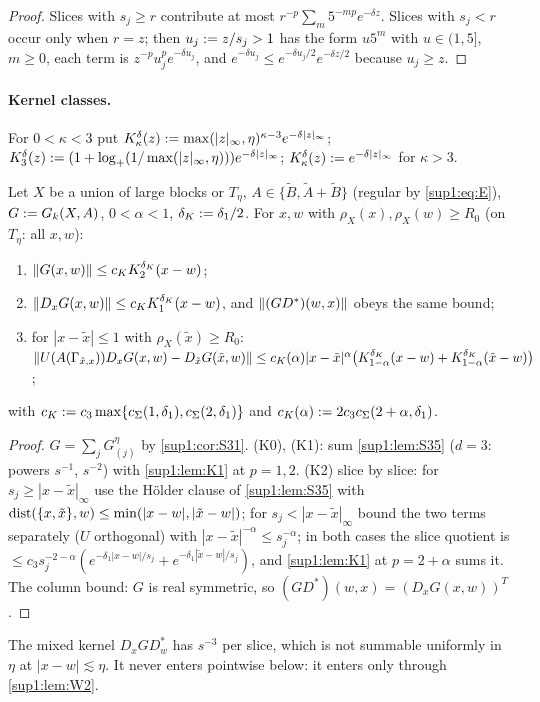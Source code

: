 \begin{proof}
Slices with $s_j\ge r$ contribute at most $r^{-p}\sum_m5^{-mp}e^{-\delta z}$. Slices with $s_j<r$ occur only when $r=z$; then $u_j:= z/s_j>1$ has the form $u5^m$ with $u\in(1,5]$, $m\ge0$, each term is $z^{-p}u_j^pe^{-\delta u_j}$, and $e^{-\delta u_j}\le e^{-\delta u_j/2}e^{-\delta z/2}$ because $u_j\ge z$.
\end{proof}

\paragraph{Kernel classes.} For $0<\kappa<3$ put $K^\delta_\kappa(z):=\max(|z|_\infty,\eta)^{\kappa-3}e^{-\delta|z|_\infty}$; $K^\delta_3(z):=(1+\log_+(1/\max(|z|_\infty,\eta)))e^{-\delta|z|_\infty}$; $K^\delta_\kappa(z):= e^{-\delta|z|_\infty}$ for $\kappa>3$.

\begin{lemma}\label{sup1:lem:K2}
Let $X$ be a union of large blocks or $T_\eta$, $A\in\{\tilde B,\tilde A+\tilde B\}$ (regular by \eqref{sup1:eq:E}), $G:= G_k(X,A)$, $0<\alpha<1$, $\delta_K:=\delta_1/2$. For $x,w$ with $\rho_X(x),\rho_X(w)\ge R_0$ (on $T_\eta$: all $x,w$):
\begin{enumerate}[label=\textup{(K\arabic*)},start=0,nosep,leftmargin=*]
\item $\lVert G(x,w)\rVert\le c_KK^{\delta_K}_2(x-w)$;
\item $\lVert D_xG(x,w)\rVert\le c_KK^{\delta_K}_1(x-w)$, and $\lVert (GD^*)(w,x)\rVert$ obeys the same bound;
\item for $|x-\tilde x|\le1$ with $\rho_X(\tilde x)\ge R_0$: $\lVert U(A(\Gamma_{\tilde x,x}))D_xG(x,w)-D_{\tilde x}G(\tilde x,w)\rVert\le c_K(\alpha)|x-\tilde x|^\alpha\big(K^{\delta_K}_{1-\alpha}(x-w)+K^{\delta_K}_{1-\alpha}(\tilde x-w)\big)$;
\end{enumerate}
with $c_K:= c_3\max\{c_\Sigma(1,\delta_1),c_\Sigma(2,\delta_1)\}$ and $c_K(\alpha):=2c_3c_\Sigma(2+\alpha,\delta_1)$.
\end{lemma}

\begin{proof}
$G=\sum_jG^\eta_{(j)}$ by \cref{sup1:cor:S31}. (K0), (K1): sum \cref{sup1:lem:S35} ($d=3$: powers $s^{-1}$, $s^{-2}$) with \cref{sup1:lem:K1} at $p=1,2$. (K2) slice by slice: for $s_j\ge|x-\tilde x|_\infty$ use the H\"older clause of \cref{sup1:lem:S35} with $\operatorname{dist}(\{x,\tilde x\},w)\le\min(|x-w|,|\tilde x-w|)$; for $s_j<|x-\tilde x|_\infty$ bound the two terms separately ($U$ orthogonal) with $|x-\tilde x|^{-\alpha}\le s_j^{-\alpha}$; in both cases the slice quotient is $\le c_3s_j^{-2-\alpha}(e^{-\delta_1|x-w|/s_j}+e^{-\delta_1|\tilde x-w|/s_j})$, and \cref{sup1:lem:K1} at $p=2+\alpha$ sums it. The column bound: $G$ is real symmetric, so $(GD^*)(w,x)=(D_xG(x,w))^T$.
\end{proof}

The mixed kernel $D_xGD^*_w$ has $s^{-3}$ per slice, which is not summable uniformly in $\eta$ at $|x-w|\lesssim\eta$. It never enters pointwise below: it enters only through \cref{sup1:lem:W2}.
